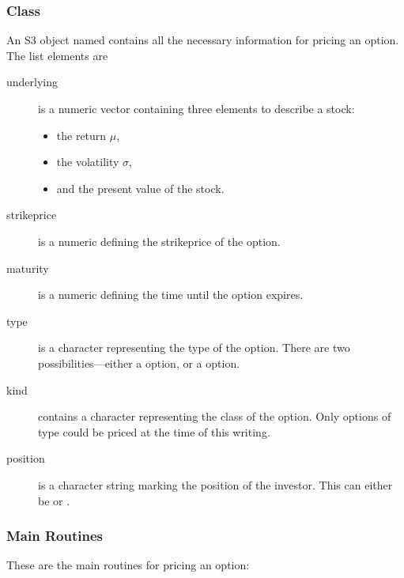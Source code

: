 \subsubsection{Class }

An S3 object named  contains all
the necessary information for pricing an option. The list elements are

\begin{description}
\item[underlying] is a numeric vector containing three elements to
  describe a stock:
  \begin{itemize}
  \item the return $\mu$,
  \item the volatility $\sigma$,
  \item and the present value of the stock.
  \end{itemize}
\item[strikeprice] is a numeric defining the strikeprice of the option.
\item[maturity] is a numeric defining the time until the option expires.
\item[type] is a character representing the type of the option. There
  are two possibilities---either a  option, or a
   option.
\item[kind] contains a character representing the class of the
  option. Only options of type  could be priced at
  the time of this writing. 
\item[position] is a character string marking the position of the
  investor. This can either be  or .
\end{description}


\subsubsection{Main Routines}

These are the main routines for pricing an option:

